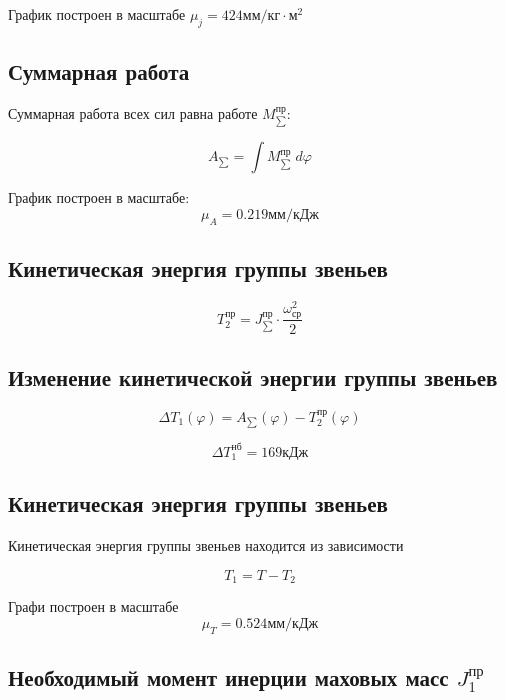График построен в масштабе $\mu_j = 424 мм/кг \cdot м^2$

\subsection{Суммарная работа}

Суммарная работа всех сил равна работе $M_{\sum}^{пр}$:

\begin{equation}
	A_{\sum} = \int{M_{\sum}^{пр} \; d \varphi}
\end{equation}

График построен в масштабе: $$\mu_A = 0.219 мм/кДж$$

\subsection{Кинетическая энергия  группы звеньев}

\begin{equation}
	T_{2}^{пр} = J_{\sum}^{пр} \cdot \dfrac{\omega_{ср}^2}{2}
\end{equation}

\subsection{Изменение кинетической энергии  группы звеньев}

\begin{equation}
	\Delta T_1(\varphi) = A_{\sum}(\varphi) - T_2^{пр}(\varphi)
\end{equation}

\begin{equation*}
	\Delta T_{1}^{нб} = 169 кДж 
\end{equation*}

\subsection{Кинетическая энергия  группы звеньев}

Кинетическая энергия  группы звеньев находится из зависимости 

\begin{equation}
	T_{1} = T - T_2
\end{equation}

Графи построен в масштабе $$\mu_T = 0.524 мм/кДж$$

\subsection{Необходимый момент инерции маховых масс $J_1^{пр}$}

